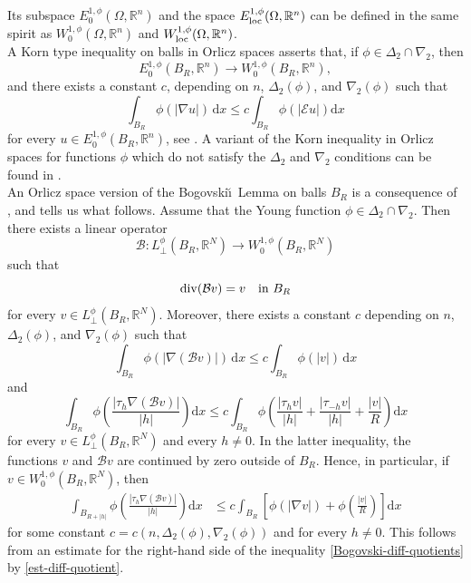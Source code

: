 \documentclass[leqno,11pt]{amsart}%
\numberwithin{equation}{section}
\def\R{\mathbb R}
\def\d{\mathrm{d}}
\def\E{\mathcal{E}}
\def\dx{\d x}
\theoremstyle{definition}
\numberwithin{equation}{section}
\begin{document}
Its subspace $ E^{1,\phi}_0 (\Omega, \mathbb R^n)$ and the space  $ E^{1,\phi}_{\rm loc} (\Omega, \mathbb R^n)$ can be defined in the same spirit as $W^{1,\phi}_0(\Omega, \mathbb R^n)$ and $W^{1,\phi}_{\rm loc}(\Omega, \mathbb R^n)$.
 \\ A Korn type inequality on balls in Orlicz spaces asserts that, if $\phi \in \Delta_2 \cap \nabla _2$, then  
$$E^{1,\phi}_0 (B_R, \mathbb R^n) \to W^{1,\phi}_0(B_R, \mathbb R^n),$$
and there exists a constant $c$, depending on $n$, $\Delta_2(\phi)$,
  and $\nabla_2(\phi)$  such that
 \begin{equation}
    \label{korn-0}\int_{B_R}\phi(|\nabla u|)\,\dx
    \le
    c\int_{B_R}\phi(|\E u|)\dx
  \end{equation}
  for every $u  \in E^{1,\phi}_0 (B_R, \mathbb R^n)$, see \cite[Thms. 6.10]{DRS:2010}. A variant of the Korn inequality in Orlicz spaces for functions $\phi$ which do not satisfy the $\Delta_2$ and $\nabla_2$ conditions can be found in \cite{cianchi_JFA}.
\\ 
An Orlicz space version of the
Bogovski\u\i\ 
 Lemma on balls $B_R$ is a consequence of \cite[Corollary 4.2]{Krepela-Ruzicka:2020}, and tells us what follows. Assume that the Young function $\phi \in \Delta_2 \cap \nabla_2$. Then there exists 
 a linear  operator
  \begin{equation}\label{july15}
\mathcal{B}:L^\phi_\perp(B_R, \mathbb R^N)\to W^{1,\phi}_0(B_R,\R^N)
  \end{equation}
  such that
\begin{equation}\label{july16}
   {\rm div}(\mathcal{B}v)=v\quad\mbox{in $B_R$}
 \end{equation}
 for every $v\in
 L^\phi_\perp(B_R, \mathbb R^N)$. 
 Moreover, there exists a constant $c$ depending on $n$,
  $\Delta_2(\phi)$, and $\nabla_2(\phi)$ such that
 \begin{equation}\label{Bogovski-gradient}
\int_{B_R}\phi(|\nabla (\mathcal{B}v)|)\, \dx\le c\int_{B_R}\phi(|v|)\, \dx
 \end{equation}
 and
 \begin{equation}\label{Bogovski-diff-quotients}
    \int_{B_R}\phi\left(\frac{|\tau_h\nabla(\mathcal{B}v)|}{|h|}\right) \dx
    \le
    c\int_{B_R}\phi\left(\frac{|\tau_hv|}{|h|}+\frac{|\tau_{-h}v|}{|h|}
      +\frac{|v|}{R}\right)\dx
  \end{equation}
  for every $v\in L^\phi_\perp(B_R, \mathbb R^N)$ and every $h\neq0$. 
In the latter inequality,   the functions  $v$ and $\mathcal{B}v$ are continued by
  zero outside of $B_R$. 
  Hence, in particular, if 
  $v\in W^{1,\phi}_0(B_R, \mathbb R^N)$, then 
\begin{align}\label{Bogovski-diff-quotients-2}
    \int_{B_{R+|h|}}\phi\left(\frac{|\tau_h\nabla (\mathcal{B}v)|}{|h|}\right) \dx
    &\le
    c\int_{B_R}\left[\phi(|\nabla v|) +\phi\left(\frac{|v|}{R}\right)\right] \dx
  \end{align}
  for some constant $c=c(n,\Delta_2(\phi),\nabla_2(\phi))$ and 
  for every $h\neq0$.
  This follows from an estimate for the right-hand side of the inequality \eqref{Bogovski-diff-quotients} by \eqref{est-diff-quotient}.
\end{document}
